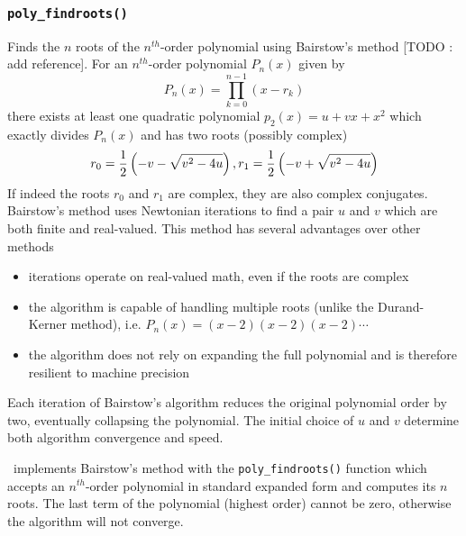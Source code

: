 \subsubsection{{\tt poly\_findroots()}}
Finds the $n$ roots of the $n^{th}$-order polynomial using Bairstow's method
[TODO : add reference].
For an $n^{th}$-order polynomial $P_n(x)$ given by
\[
    P_n(x) = \prod_{k=0}^{n-1}{(x-r_k)}
\]
there exists at least one quadratic polynomial $p_{2}(x)=u + vx + x^2$ which
exactly divides $P_{n}(x)$ and has two roots (possibly complex)
\[
    r_0 = \frac{1}{2}\left(-v-\sqrt{v^2-4u}\right), \; \\
    r_1 = \frac{1}{2}\left(-v+\sqrt{v^2-4u}\right)
\]
If indeed the roots $r_0$ and $r_1$ are complex, they are also complex
conjugates.
Bairstow's method uses Newtonian iterations to find a pair $u$ and $v$ which
are both finite and real-valued.
This method has several advantages over other methods
\begin{itemize}
\item iterations operate on real-valued math, even if the roots are complex
\item the algorithm is capable of handling multiple roots (unlike the
      Durand-Kerner method), i.e. $P_{n}(x) = (x-2)(x-2)(x-2)\cdots$
\item the algorithm does not rely on expanding the full polynomial and is
      therefore resilient to machine precision
\end{itemize}
Each iteration of Bairstow's algorithm reduces the original polynomial order
by two, eventually collapsing the polynomial.
The initial choice of $u$ and $v$ determine both algorithm convergence and
speed.

\liquid\ implements Bairstow's method with the {\tt poly\_findroots()}
function which accepts an $n^{th}$-order polynomial in standard expanded form
and computes its $n$ roots.
The last term of the polynomial (highest order) cannot be zero, otherwise the
algorithm will not converge.


